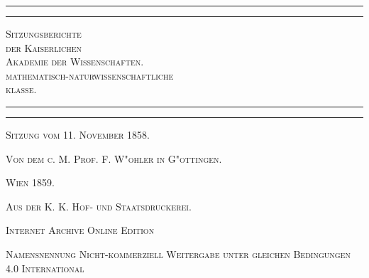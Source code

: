 \documentclass[a4paper, 11pt, oneside]{article}
\begin{document}
\begin{titlepage} %
	\centering %

	
	\rule{\textwidth}{1.6pt}\vspace*{-\baselineskip}\vspace*{2pt} %
	\rule{\textwidth}{0.4pt} %
	
	\vspace{1\baselineskip} %
	
	{\scshape\LARGE Sitzungsberichte\\[1.25pt] der Kaiserlichen\\[1.25pt] Akademie der Wissenschaften.\\[1.25pt] mathematisch-naturwissenschaftliche\\[1.25pt] klasse.\\[1.25pt]}
	
	\vspace{1\baselineskip} %

	\rule{\textwidth}{0.4pt}\vspace*{-\baselineskip}\vspace{3.2pt} %
	\rule{\textwidth}{1.6pt} %
	
	\vspace{1\baselineskip} %
	
	
	{\scshape Sitzung vom 11. November 1858.} %
	
	\vspace*{1\baselineskip} %
	
    {\scshape\small Von dem c. M. Prof. F. W"ohler in G"ottingen.} %
    
    \vspace*{\fill}

	\vspace{1\baselineskip}

	{\small\scshape Wien 1859.}
	
	{\small\scshape{Aus der K. K. Hof- und Staatsdruckerei.}}
	
	\vspace{0.5\baselineskip} %

    \scshape Internet Archive Online Edition  %
	
	{\scshape\small Namensnennung Nicht-kommerziell Weitergabe unter gleichen Bedingungen 4.0 International} %
\end{titlepage}
\setlength{\parskip}{1mm plus1mm minus1mm}
\clearpage
\tableofcontents
\clearpage
\end{document}
